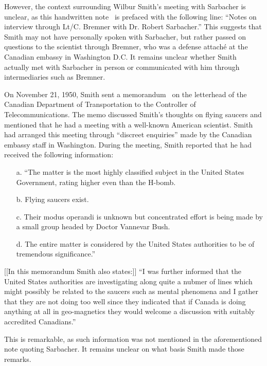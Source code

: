 However, the context surrounding Wilbur Smith's meeting with Sarbacher is unclear, as this handwritten note~\cite{SmithWilbertNotes} is prefaced with the following line:
``Notes on interview through Lt/C. Bremner with Dr. Robert Sarbacher.''
This suggests that Smith may not have personally spoken with Sarbacher,
but rather passed on questions to the scientist through Bremner, who was a defense attach\'e at the Canadian embassy in Washington D.C.
It remains unclear whether Smith actually met
with Sarbacher in person or communicated with him through intermediaries such as Bremner.

On November 21, 1950, Smith sent a memorandum~\cite{SmithWilbertMemo} on the letterhead of the Canadian Department of Transportation to the Controller of Telecommunications. The memo discussed Smith's thoughts on flying saucers and mentioned that he had a meeting with a well-known American scientist. Smith had arranged this meeting through ``discreet enquiries'' made by the Canadian embassy staff in Washington.
During the meeting, Smith reported that he had received the following information:
\begin{svgraybox}
\begin{enumerate}
\item[a.] ``The matter is the most highly classified subject in the United States
Government, rating higher even than the H-bomb.
\item[b.] Flying saucers exist.
\item[c.] Their modus operandi is unknown but concentrated effort is being
made
by a small group headed by Doctor Vannevar Bush.
\item[d.] The entire matter is considered by the United States authorities to be
of tremendous significance.''
\end{enumerate}

[[In this memorandum Smith also states:]] ``I was further informed that the United States authorities are
investigating along quite a nubmer of lines which might possibly be
related to the saucers such as mental phenomena and I gather that they are
not doing too well since they indicated that if Canada is doing anything
at all in geo-magnetics they would welcome a discussion with suitably
accredited Canadians.''
\end{svgraybox}
This is remarkable, as such information was not mentioned in the aforementioned note quoting Sarbacher. It remains unclear on what basis Smith made those remarks.

